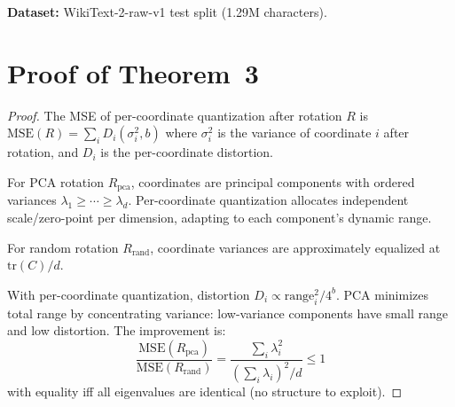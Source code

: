 \documentclass{article}
\begin{document}
\textbf{Dataset:} WikiText-2-raw-v1 \citep{merity2017pointer} test split (1.29M characters).

\section{Proof of Theorem~3}

\begin{proof}
The MSE of per-coordinate quantization after rotation $R$ is $\text{MSE}(R) = \sum_i D_i(\sigma_i^2, b)$ where $\sigma_i^2$ is the variance of coordinate $i$ after rotation, and $D_i$ is the per-coordinate distortion.

For PCA rotation $R_{\text{pca}}$, coordinates are principal components with ordered variances $\lambda_1 \geq \cdots \geq \lambda_d$. Per-coordinate quantization allocates independent scale/zero-point per dimension, adapting to each component's dynamic range.

For random rotation $R_{\text{rand}}$, coordinate variances are approximately equalized at $\text{tr}(C)/d$.

With per-coordinate quantization, distortion $D_i \propto \text{range}_i^2 / 4^b$. PCA minimizes total range by concentrating variance: low-variance components have small range and low distortion. The improvement is:
\begin{equation}
\frac{\text{MSE}(R_{\text{pca}})}{\text{MSE}(R_{\text{rand}})} = \frac{\sum_i \lambda_i^2}{\left(\sum_i \lambda_i\right)^2 / d} \leq 1
\end{equation}
with equality iff all eigenvalues are identical (no structure to exploit).
\end{proof}



\end{document}
